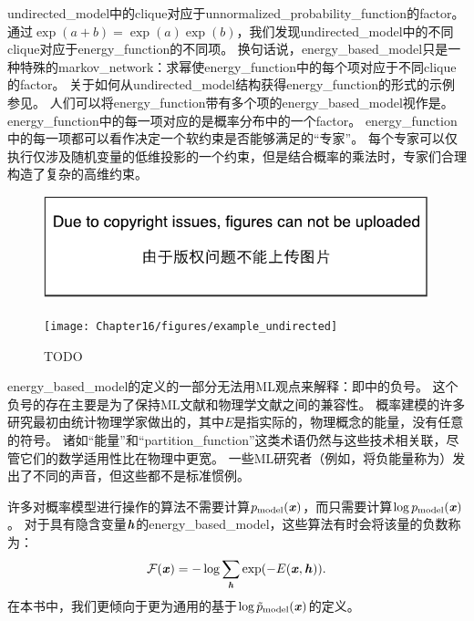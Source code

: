 \gls{undirected_model}中的\gls{clique}对应于\gls{unnormalized_probability_function}的\gls{factor}。 
通过$\exp(a+b) = \exp(a) \exp(b)$，我们发现\gls{undirected_model}中的不同\gls{clique}对应于\gls{energy_function}的不同项。
换句话说，\gls{energy_based_model}只是一种特殊的\gls{markov_network}：求幂使\gls{energy_function}中的每个项对应于不同\gls{clique}的\gls{factor}。
关于如何从\gls{undirected_model}结构获得\gls{energy_function}的形式的示例参见。
人们可以将\gls{energy_function}带有多个项的\gls{energy_based_model}视作是\citep{Hinton99}。
\gls{energy_function}中的每一项对应的是概率分布中的一个\gls{factor}。
\gls{energy_function}中的每一项都可以看作决定一个软约束是否能够满足的``专家''。
每个专家可以仅执行仅涉及随机变量的低维投影的一个约束，但是结合概率的乘法时，专家们合理构造了复杂的高维约束。
\begin{figure}[!htb]
\ifOpenSource
\centerline{\includegraphics{figure.pdf}}
\else
	\centerline{\texttt{[image: Chapter16/figures/example\_undirected]}}
\fi
	\caption{TODO}
	\label{fig:example_undirected_2}
\end{figure}



\gls{energy_based_model}的定义的一部分无法用\gls{ML}观点来解释：即中的负号。
这个负号的存在主要是为了保持\gls{ML}文献和物理学文献之间的兼容性。
概率建模的许多研究最初由统计物理学家做出的，其中$E$是指实际的，物理概念的能量，没有任意的符号。
诸如``能量''和``\gls{partition_function}''这类术语仍然与这些技术相关联，尽管它们的数学适用性比在物理中更宽。
一些\gls{ML}研究者（例如，\citep{Smolensky86}将负能量称为）发出了不同的声音，但这些都不是标准惯例。


许多对概率模型进行操作的算法不需要计算$p_{\text{model}}(\boldsymbol{\mathit{x}})$，而只需要计算$\log p_{\text{model}}(\boldsymbol{\mathit{x}})$。
对于具有隐含变量$\boldsymbol{\mathit{h}}$的\gls{energy_based_model}，这些算法有时会将该量的负数称为：
\begin{align}
\label{eqn:168}
\mathcal{F} (\boldsymbol{\mathit{x}}) = -\log \sum_{\boldsymbol{\mathit{h}}} \exp(-E(\boldsymbol{\mathit{x}},\boldsymbol{\mathit{h}})).
\end{align}
在本书中，我们更倾向于更为通用的基于$\log \tilde{p}_{\text{model}}(\boldsymbol{\mathit{x}})$的定义。


